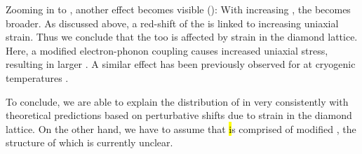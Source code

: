 	Zooming in to \vl, another effect becomes visible ():
	With increasing  \ZPL \cwl, the \lw becomes broader.
	As discussed above, a red-shift of the \ZPL is linked to increasing uniaxial strain.
	Thus we conclude that the \ZPL \lw too is affected by strain in the diamond lattice.
	Here, a modified electron-phonon coupling \cite{Jahnke2015a} causes increased uniaxial stress, resulting in larger \lws.
	A similar effect has been previously observed for \sivs at cryogenic temperatures \cite{Arend2016a}.
	
	To conclude, we are able to explain the distribution of \ZPL \cwls in \vl very consistently with theoretical predictions based on perturbative shifts due to strain in the diamond lattice.
	On the other hand, we have to assume that \hl is comprised of modified \sivs, the structure of which is currently unclear.

